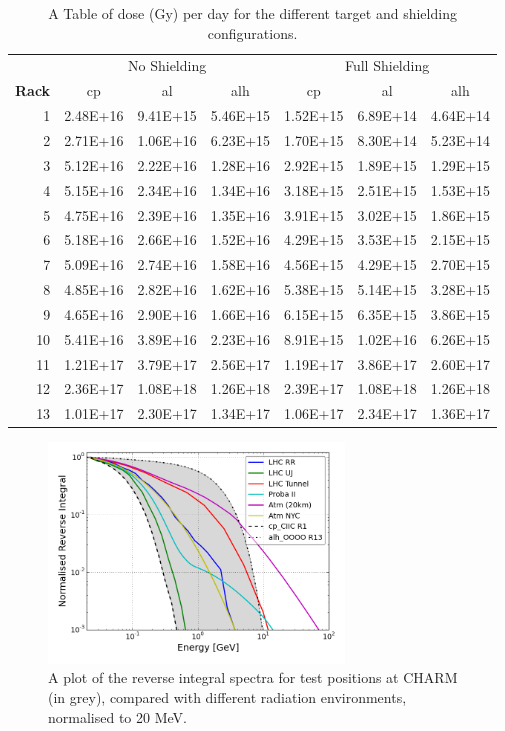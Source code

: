 \begin{table}[htbp]
\centering
\begin{tabular}{r|c|c|c|c|c|c}
& \multicolumn{3}{c|}{No Shielding} & \multicolumn{3}{c}{Full Shielding} \\ \cline{2-7}
\textbf{Rack}  & cp    & al    & alh   & cp    & al    & alh\\ 
\hline
1 & 2.48E+16 & 9.41E+15 &  5.46E+15 & 1.52E+15 & 6.89E+14 &  4.64E+14 \\
2 & 2.71E+16 & 1.06E+16 &  6.23E+15 & 1.70E+15 & 8.30E+14 &  5.23E+14 \\
3 & 5.12E+16 & 2.22E+16 &  1.28E+16 & 2.92E+15 & 1.89E+15 &  1.29E+15 \\
4 & 5.15E+16 & 2.34E+16 &  1.34E+16 & 3.18E+15 & 2.51E+15 &  1.53E+15 \\
5 & 4.75E+16 & 2.39E+16 &  1.35E+16 & 3.91E+15 & 3.02E+15 &  1.86E+15 \\
6 & 5.18E+16 & 2.66E+16 &  1.52E+16 & 4.29E+15 & 3.53E+15 &  2.15E+15 \\
7 & 5.09E+16 & 2.74E+16 &  1.58E+16 & 4.56E+15 & 4.29E+15 &  2.70E+15 \\
8 & 4.85E+16 & 2.82E+16 &  1.62E+16 & 5.38E+15 & 5.14E+15 &  3.28E+15 \\
9 & 4.65E+16 & 2.90E+16 &  1.66E+16 & 6.15E+15 & 6.35E+15 &  3.86E+15 \\
10 & 5.41E+16 & 3.89E+16 &  2.23E+16 & 8.91E+15 & 1.02E+16 &  6.26E+15 \\
11 & 1.21E+17 & 3.79E+17 &  2.56E+17 & 1.19E+17 & 3.86E+17 &  2.60E+17 \\
12 & 2.36E+17 & 1.08E+18 &  1.26E+18 & 2.39E+17 & 1.08E+18 &  1.26E+18 \\
13 & 1.01E+17 & 2.30E+17 &  1.34E+17 & 1.06E+17 & 2.34E+17 &  1.36E+17 \\
\end{tabular}
\caption{A Table of dose (Gy) per day for the different target and shielding configurations. }
\label{tab:dose_per_day_all}%
\end{table}%

\begin{figure}[ht!]
	\centering
	\includegraphics[width=0.7\textwidth]{./images/hardness/all_env_charm}
	\caption{A plot of the reverse integral spectra for test positions at CHARM (in grey), compared with different radiation environments, normalised to 20 MeV.}
	\label{fig:example_rev_spectra}
\end{figure}

